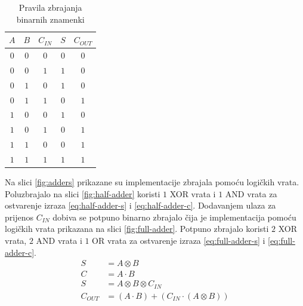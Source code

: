 \documentclass[times, utf8, diplomski]{fer}
\begin{document}
\begin{table}
	\centering
	\caption{Pravila zbrajanja binarnih znamenki}
	\label{tab:binary-addition}
	\begin{tabular}{|ccc|c|c|}
		\hline
		$A$ & $B$ & $C_{IN}$ 	& \hspace{0.29cm} $S$ \hspace{0.29cm} & $C_{OUT}$	\\
		\hline
		$0$ & $0$ & $0$			& $0$ & $0$			\\
		$0$ & $0$ & $1$			& $1$ & $0$			\\
		$0$ & $1$ & $0$			& $1$ & $0$			\\
		$0$ & $1$ & $1$			& $0$ & $1$			\\
		$1$ & $0$ & $0$			& $1$ & $0$			\\
		$1$ & $0$ & $1$			& $0$ & $1$			\\
		$1$ & $1$ & $0$			& $0$ & $1$			\\
		$1$ & $1$ & $1$			& $1$ & $1$			\\
		\hline
	\end{tabular}
\end{table}

Na slici \ref{fig:adders} prikazane su implementacije zbrajala pomoću logičkih vrata. Poluzbrajalo na slici \ref{fig:half-adder} koristi $1$ XOR vrata i $1$ AND vrata za ostvarenje izraza \ref{eq:half-adder-s} i \ref{eq:half-adder-c}. Dodavanjem ulaza za prijenos $C_{IN}$ dobiva se potpuno binarno zbrajalo čija  je implementacija pomoću logičkih vrata prikazana na slici \ref{fig:full-adder}. Potpuno zbrajalo koristi $2$ XOR vrata, $2$ AND vrata i $1$ OR vrata za ostvarenje izraza \ref{eq:full-adder-s} i \ref{eq:full-adder-c}.
%
\begin{align}
	\label{eq:half-adder-s}
	S &= A \otimes B \\
	\label{eq:half-adder-c}
	C &= A \cdot B \\
	\label{eq:full-adder-s}
	S &= A \otimes B \otimes C_{IN} \\
	\label{eq:full-adder-c}
	C_{OUT} &= (A \cdot B) + (C_{IN} \cdot (A \otimes B))
\end{align}
\end{document}
